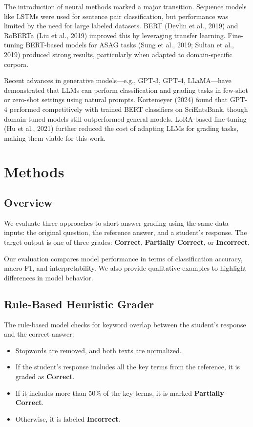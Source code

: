 \documentclass[11pt]{article}
\begin{document}
The introduction of neural methods marked a major transition. Sequence models like LSTMs were used for sentence pair classification, but performance was limited by the need for large labeled datasets. BERT (Devlin et al., 2019) and RoBERTa (Liu et al., 2019) improved this by leveraging transfer learning. Fine-tuning BERT-based models for ASAG tasks (Sung et al., 2019; Sultan et al., 2019) produced strong results, particularly when adapted to domain-specific corpora.

Recent advances in generative models—e.g., GPT-3, GPT-4, LLaMA—have demonstrated that LLMs can perform classification and grading tasks in few-shot or zero-shot settings using natural prompts. Kortemeyer (2024) found that GPT-4 performed competitively with trained BERT classifiers on SciEntsBank, though domain-tuned models still outperformed general models. LoRA-based fine-tuning (Hu et al., 2021) further reduced the cost of adapting LLMs for grading tasks, making them viable for this work.

\section{Methods}
\subsection{Overview}
We evaluate three approaches to short answer grading using the same data inputs: the original question, the reference answer, and a student’s response. The target output is one of three grades: \textbf{Correct}, \textbf{Partially Correct}, or \textbf{Incorrect}.

Our evaluation compares model performance in terms of classification accuracy, macro-F1, and interpretability. We also provide qualitative examples to highlight differences in model behavior.

\subsection{Rule-Based Heuristic Grader}
The rule-based model checks for keyword overlap between the student’s response and the correct answer:
\begin{itemize}
    \item Stopwords are removed, and both texts are normalized.
    \item If the student’s response includes all the key terms from the reference, it is graded as \textbf{Correct}.
    \item If it includes more than 50\% of the key terms, it is marked \textbf{Partially Correct}.
    \item Otherwise, it is labeled \textbf{Incorrect}.
\end{itemize}
\end{document}

